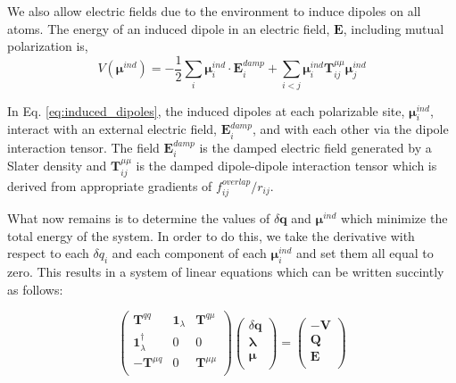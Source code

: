 \documentclass[journal=jacsat,manuscript=article]{achemso}
\begin{document}
We also allow electric fields due to the environment to induce dipoles on all atoms. The energy of an induced dipole in an electric field, $\bm{E}$, including mutual polarization is,
\begin{equation}
  V(\bm{\mu}^{ind})=-\frac12\sum_i \bm{\mu}_i^{ind}\cdot \bm{E}_i^{damp} + \sum_{i<j}\bm{\mu}^{ind}_i \bm{T}^{\mu\mu}_{ij}\bm{\mu}^{ind}_j
  \label{eq:induced_dipoles}
\end{equation}

In Eq. \ref{eq:induced_dipoles}, the induced dipoles at each polarizable site, $\bm{\mu}_i^{ind}$, interact with an external electric field, $\bm{E}_i^{damp}$, and with each other via the dipole interaction tensor. The field $\bm{E}_i^{damp}$ is the damped electric field generated by a Slater density and $\bm{T}^{\mu\mu}_{ij}$ is the damped dipole-dipole interaction tensor which is derived from appropriate gradients of $f_{ij}^{overlap}/r_{ij}$.

What now remains is to determine the values of $\delta \bm{q}$ and $\bm{\mu}^{ind}$ which minimize the total energy of the system. In order to do this, we take the derivative with respect to each $\delta q_i$ and each component of each $\bm{\mu}_i^{ind}$ and set them all equal to zero. This results in a system of linear equations which can be written succintly as follows:


\begin{equation}
  \begin{pmatrix}
    \bm{T}^{qq} & \bm{1}_\lambda & \bm{T}^{q\mu} \\
    \bm{1}_\lambda^\dagger & 0 & 0 \\
    -\bm{T}^{\mu q} & 0 & \bm{T}^{\mu\mu} \\
  \end{pmatrix}
  \begin{pmatrix}
    \delta \bm{q} \\
    \bm{\lambda} \\
    \bm{\mu} \\
  \end{pmatrix}
  =
  \begin{pmatrix}
    -\bm{V} \\
    \bm{Q} \\
    \bm{E} \\
  \end{pmatrix}
  \label{eq:pol_mat}
\end{equation}
\end{document}
